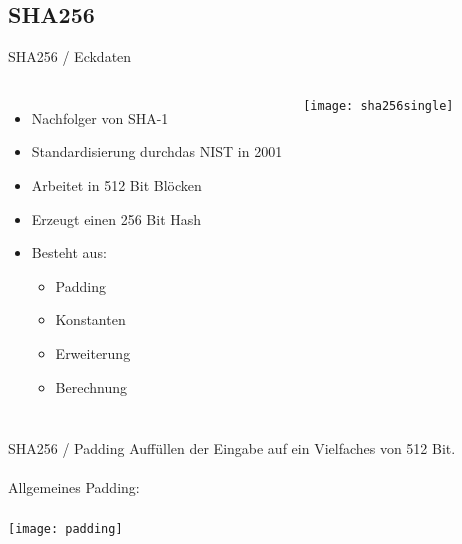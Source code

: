 \documentclass{beamer}
\begin{document}
\subsection{SHA256}
    \begin{frame}{SHA256 / Eckdaten}
      \begin{columns}[T]
        \begin{itemize}
          \item Nachfolger von SHA-1\\
          \item Standardisierung durch\newline das NIST in 2001\\
          \item Arbeitet in 512 Bit Blöcken\\
          \item Erzeugt einen 256 Bit Hash\\
          \item Besteht aus:\\
          \begin{itemize}
            \item Padding\\
            \item Konstanten\\
            \item Erweiterung\\
            \item Berechnung
          \end{itemize}
        \end{itemize}
        \texttt{[image: sha256single]}
      \end{columns} 
    \end{frame}
    \begin{frame}{SHA256 / Padding}
      Auffüllen der Eingabe auf ein Vielfaches von 512 Bit.\\
      ~\\
      Allgemeines Padding:\\
      ~\\
      \texttt{[image: padding]}\\
    \end{frame}
\end{document}
